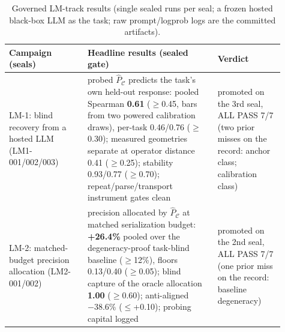 \documentclass[letterpaper,onecolumn]{IEEEtran}
\theoremstyle{definition}
\theoremstyle{remark}
\newcommand{\PC}{P_{\mathcal{C}}}
\begin{document}
\begin{table}[t]
\caption{Governed LM-track results (single sealed runs per seal; a
frozen hosted black-box LLM as the task; raw prompt/logprob logs
are the committed artifacts).}
\label{tab:lm-evidence}
\centering
\begin{tabular}{@{}p{0.26\linewidth}p{0.43\linewidth}p{0.22\linewidth}@{}}
\toprule
\textbf{Campaign (seals)} & \textbf{Headline results (sealed gate)} & \textbf{Verdict} \\
\midrule
LM-1: blind recovery from a hosted LLM (LM1-001/002/003) &
probed $\widehat\PC$ predicts the task's own held-out response:
pooled Spearman \textbf{0.61} ($\ge$0.45, bars from two powered
calibration draws), per-task 0.46/0.76 ($\ge$0.30); measured
geometries separate at operator distance 0.41 ($\ge$0.25); stability
0.93/0.77 ($\ge$0.70); repeat/parse/transport instrument gates clean &
promoted on the 3rd seal, ALL PASS 7/7 (two prior misses on the
record: anchor class; calibration class) \\
\addlinespace
LM-2: matched-budget precision allocation (LM2-001/002) &
precision allocated by $\widehat\PC$ at matched serialization budget:
\textbf{+26.4\%} pooled over the degeneracy-proof task-blind baseline
($\ge$12\%), floors 0.13/0.40 ($\ge$0.05); blind capture of the oracle
allocation \textbf{1.00} ($\ge$0.60); anti-aligned $-38.6\%$
($\le$+0.10); probing capital logged & promoted on the 2nd seal, ALL
PASS 7/7 (one prior miss on the record: baseline degeneracy) \\
\bottomrule
\end{tabular}
\end{table}
\end{document}
